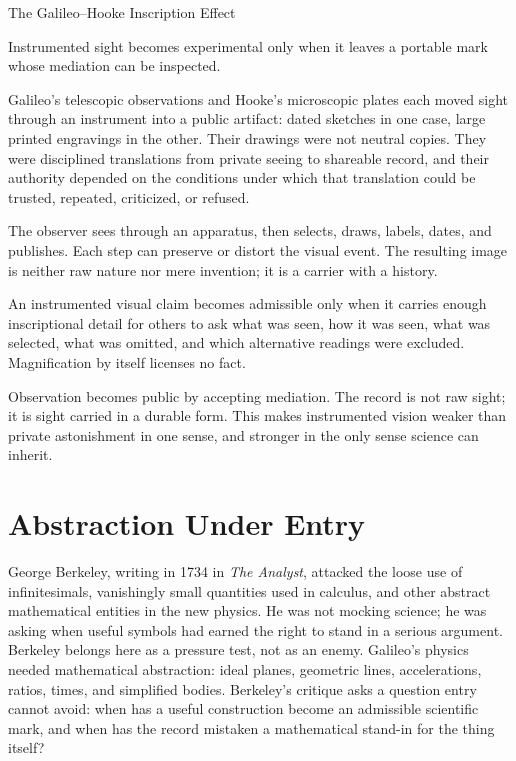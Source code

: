 \begin{phenom}{The Galileo--Hooke Inscription Effect~\cite{galileo1610,hooke1665}}
\label{ph:galileo-hooke-inscription}

\PhStatement
Instrumented sight becomes experimental only when it leaves a portable mark
whose mediation can be inspected.

\PhOrigin
Galileo's telescopic observations and Hooke's microscopic plates each moved
sight through an instrument into a public artifact: dated sketches in one case,
large printed engravings in the other. Their drawings were not neutral copies.
They were disciplined translations from private seeing to shareable record,
and their authority depended on the conditions under which that translation
could be trusted, repeated, criticized, or refused.

\PhObservation
The observer sees through an apparatus, then selects, draws, labels, dates, and
publishes. Each step can preserve or distort the visual event. The resulting
image is neither raw nature nor mere invention; it is a carrier with a history.

\PhConstraint
An instrumented visual claim becomes admissible only when it carries enough
inscriptional detail for others to ask what was seen, how it was seen, what
was selected, what was omitted, and which alternative readings were excluded.
Magnification by itself licenses no fact.

\PhConsequence
Observation becomes public by accepting mediation. The record is not raw
sight; it is sight carried in a durable form. This makes instrumented vision
weaker than private astonishment in one sense, and stronger in the only
sense science can inherit.
\end{phenom}

\section{Abstraction Under Entry}

George Berkeley, writing in 1734 in \emph{The Analyst}, attacked the loose
use of infinitesimals, vanishingly small quantities used in calculus, and
other abstract mathematical entities in the new physics.
He was not mocking science; he was asking when useful symbols had earned
the right to stand in a serious argument. Berkeley belongs here as a
pressure test, not as an enemy. Galileo's physics needed mathematical
abstraction: ideal planes, geometric lines, accelerations, ratios, times,
and simplified bodies. Berkeley's critique asks a question entry cannot
avoid: when has a useful construction become an admissible scientific mark,
and when has the record mistaken a mathematical stand-in for the thing
itself?

